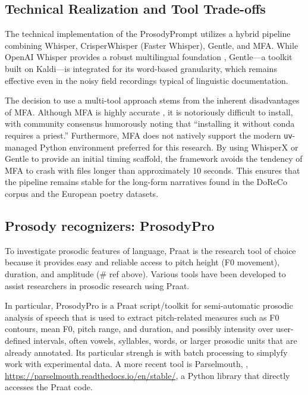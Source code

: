 \subsection{Technical Realization and Tool Trade-offs}

The technical implementation of the ProsodyPrompt utilizes a hybrid pipeline combining Whisper, CrisperWhisper (Faster Whisper), Gentle, and MFA. While OpenAI Whisper provides a robust multilingual foundation \cite{radford2023whisper}, Gentle---a toolkit built on Kaldi---is integrated for its word-based granularity, which remains effective even in the noisy field recordings typical of linguistic documentation.

The decision to use a multi-tool approach stems from the inherent disadvantages of MFA. Although MFA is highly accurate \cite{mcauliffe2017mfa}, it is notoriously difficult to install, with community consensus humorously noting that ``installing it without conda requires a priest.'' Furthermore, MFA does not natively support the modern \texttt{uv}-managed Python environment preferred for this research. By using WhisperX \cite{bain2023whisperx} or Gentle to provide an initial timing scaffold, the framework avoids the tendency of MFA to crash with files longer than approximately 10 seconds. This ensures that the pipeline remains stable for the long-form narratives found in the DoReCo corpus and the European poetry datasets.

\subsection{Prosody recognizers: ProsodyPro}

To investigate prosodic features of language, Praat is the research tool of choice because it provides easy and reliable access to pitch height (F0 movement), duration, and amplitude (# ref above). Various tools have been developed to assist researchers in prosodic research using Praat. 

In particular, ProsodyPro \cite{xu2013prosodypro} is a Praat script/toolkit for semi-automatic prosodic analysis of speech that is used to extract pitch-related measures such as F0 contours, mean F0, pitch range, and duration, and possibly intensity over user-defined intervals, often vowels, syllables, words, or larger prosodic units that are already annotated. Its particular strengh is with batch processing to simplyfy work with experimental data. A more recent tool is Parselmouth, \cite{Jadoul2018},  \url{https://parselmouth.readthedocs.io/en/stable/}, a Python library that directly accesses the Praat code. 

